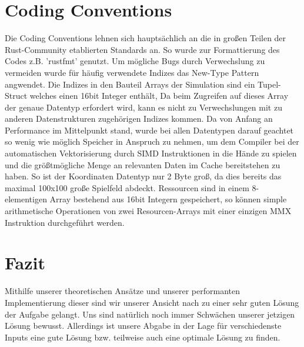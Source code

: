 \documentclass[12pt,a4paper]{article}
\begin{document}
\newpage

\section{Coding Conventions}
Die Coding Conventions lehnen sich hauptsächlich an die in großen Teilen der Rust-Community etablierten Standards an. So wurde zur Formattierung des Codes z.B. 'rustfmt' genutzt.
Um mögliche Bugs durch Verwechslung zu vermeiden wurde für häufig verwendete Indizes das New-Type Pattern angwendet. Die Indizes in den Bauteil Arrays der Simulation sind ein Tupel-Struct welches einen 16bit Integer enthält, Da beim Zugreifen auf dieses Array der genaue Datentyp erfordert wird, kann es nicht zu Verwechslungen mit zu anderen Datenstrukturen zugehörigen Indizes kommen.
Da von Anfang an Performance im Mittelpunkt stand, wurde bei allen Datentypen darauf geachtet so wenig wie möglich Speicher in Anspruch zu nehmen, um dem Compiler bei der automatischen Vektorisierung durch SIMD Instruktionen in die Hände zu spielen und die größtmögliche Menge an relevanten Daten im Cache bereitstehen zu haben. So ist der Koordinaten Datentyp nur 2 Byte groß, da dies bereits das maximal 100x100 große Spielfeld abdeckt. Ressourcen sind in einem 8-elementigen Array bestehend aus 16bit Integern gespeichert, so können simple arithmetische Operationen von zwei Resourcen-Arrays mit einer einzigen MMX Instruktion durchgeführt werden.

\section{Fazit}

Mithilfe unserer theoretischen Ansätze und unserer performanten Implementierung dieser sind wir unserer Ansicht nach zu einer sehr guten Lösung der Aufgabe gelangt. Uns sind natürlich noch immer Schwächen unserer jetzigen Lösung bewusst. Allerdings ist unsere Abgabe in der Lage für  verschiedenste Inputs eine gute Lösung bzw. teilweise auch eine optimale Lösung zu finden.
\end{document}

